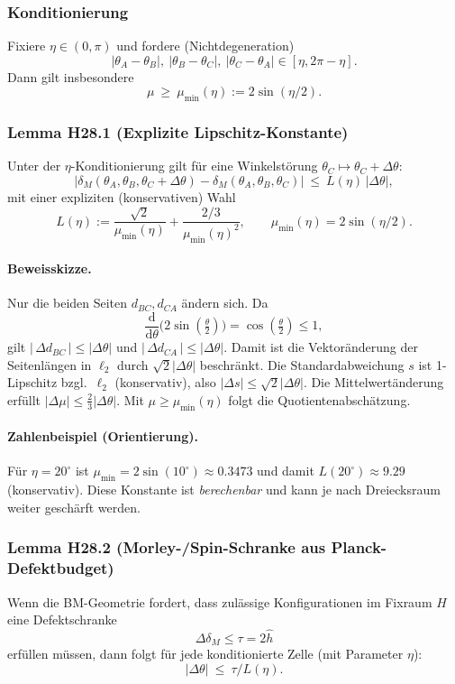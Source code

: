 \subsubsection{Konditionierung}
Fixiere $\eta\in(0,\pi)$ und fordere (Nichtdegeneration)
\[
|\theta_A-\theta_B|,\ |\theta_B-\theta_C|,\ |\theta_C-\theta_A| \in [\eta,2\pi-\eta].
\]
Dann gilt insbesondere
\[
\mu \ \ge\ \mu_{\min}(\eta):= 2\sin(\eta/2).
\]

\subsubsection{Lemma H28.1 (Explizite Lipschitz-Konstante)}
\begin{lemma}
Unter der $\eta$-Konditionierung gilt f\"ur eine Winkelst\"orung $\theta_C\mapsto\theta_C+\Delta\theta$:
\[
|\delta_M(\theta_A,\theta_B,\theta_C+\Delta\theta)-\delta_M(\theta_A,\theta_B,\theta_C)|
\ \le\ L(\eta)\,|\Delta\theta|,
\]
mit einer expliziten (konservativen) Wahl
\[
L(\eta):=\frac{\sqrt 2}{\mu_{\min}(\eta)}+\frac{2/3}{\mu_{\min}(\eta)^2},
\qquad \mu_{\min}(\eta)=2\sin(\eta/2).
\]
\end{lemma}

\paragraph{Beweisskizze.}
Nur die beiden Seiten $d_{BC},d_{CA}$ \"andern sich. Da
\[
\frac{\mathrm d}{\mathrm d\theta}\bigl(2\sin(\tfrac{\theta}{2})\bigr)=\cos(\tfrac{\theta}{2})\le 1,
\]
gilt $|\,\Delta d_{BC}\,|\le |\Delta\theta|$ und $|\,\Delta d_{CA}\,|\le|\Delta\theta|$.
Damit ist die Vektor\"anderung der Seitenl\"angen in $\ell_2$ durch $\sqrt 2|\Delta\theta|$ beschr\"ankt.
Die Standardabweichung $s$ ist 1-Lipschitz bzgl.\ $\ell_2$ (konservativ), also $|\Delta s|\le \sqrt 2|\Delta\theta|$.
Die Mittelwert\"anderung erf\"ullt $|\Delta \mu|\le \tfrac{2}{3}|\Delta\theta|$. Mit $\mu\ge \mu_{\min}(\eta)$ folgt die Quotientenabsch\"atzung.

\paragraph{Zahlenbeispiel (Orientierung).}
F\"ur $\eta=20^\circ$ ist $\mu_{\min}=2\sin(10^\circ)\approx 0.3473$ und damit
$L(20^\circ)\approx 9.29$ (konservativ).
Diese Konstante ist \emph{berechenbar} und kann je nach Dreiecksraum weiter gesch\"arft werden.

\subsubsection{Lemma H28.2 (Morley-/Spin-Schranke aus Planck-Defektbudget)}
\begin{lemma}[Defektbudget]
Wenn die BM-Geometrie fordert, dass zul\"assige Konfigurationen im Fixraum $H$ eine Defektschranke
\[
\Delta\delta_M \le \tau=2\hat h
\]
erf\"ullen m\"ussen, dann folgt f\"ur jede konditionierte Zelle (mit Parameter $\eta$):
\[
|\Delta\theta|\ \le\ \tau/L(\eta).
\]
\end{lemma}

